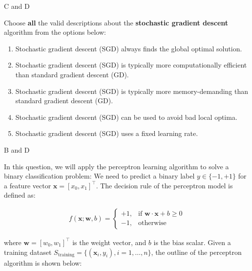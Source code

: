 \documentclass{article}
\newcommand{\x}{\mathbf{x}}
\newcommand{\w}{\mathbf{w}}
\begin{document}
\begin{probset}
\begin{prob}
\begin{subprobset}
\begin{subprob}
        \begin{soln}
            C and D
        \end{soln}
    \end{subprob}

    \begin{subprob}
        Choose \textbf{all} the valid descriptions about the \textbf{stochastic gradient descent} algorithm
        from the options below:
        \begin{enumerate}[label=\Alph*.]
            \item Stochastic gradient descent (SGD) always finds the global optimal solution.
            \item Stochastic gradient descent (SGD) is typically more computationally efficient than standard gradient descent (GD).
            \item Stochastic gradient descent (SGD) is typically more memory-demanding than standard gradient descent (GD).
            \item Stochastic gradient descent (SGD) can be used to avoid bad local optima.
            \item Stochastic gradient descent (SGD) uses a fixed learning rate.
        \end{enumerate}

        \begin{soln}
            B and D
        \end{soln}
    \end{subprob}

    \begin{subprob}
        In this question, we will apply the perceptron learning algorithm to solve a binary classification problem: We need to predict a binary label $y \in \{-1, +1\}$ for a feature vector $\x = [x_0, x_1]^\top$. The decision rule of the perceptron model is defined as:

        \begin{align} 
            f(\x; \w, b) = \begin{cases}
                +1, & \text{if } \w \cdot \x + b \geq 0 \\
                -1, & \text{otherwise}
            \end{cases}
        \end{align}

        where $\w = [w_0, w_1]^\top$ is the weight vector, and $b$ is the bias scalar. Given a training dataset $S_\text{training} = \{(\x_i, y_i), i = 1, \ldots, n\}$, the outline of the perceptron algorithm is shown below:


\end{subprob}
\end{subprobset}
\end{prob}
\end{probset}
\end{document}
